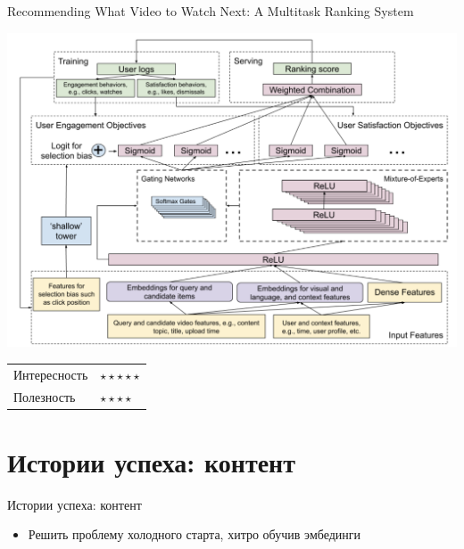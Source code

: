 \documentclass[11pt,aspectratio=169]{beamer}
\begin{document}
\begin{frame}{Recommending What Video to Watch Next: A Multitask Ranking System \cite{RANKING}}

\begin{center}
\includegraphics[scale=0.25]{images/multitask.png}
\end{center}

\begin{tabular}{l l}
Интересность & $\star\star\star\star\star$ \\
Полезность & $\star\star\star\star$
\end{tabular}

\end{frame}

\section{Истории успеха: контент}

\begin{frame}{Истории успеха: контент}

\begin{tcolorbox}[colback=info!5,colframe=info!80,title=Как оставить след в науке]
\begin{itemize}
\item Решить проблему холодного старта, хитро обучив эмбединги
\end{itemize}
\end{tcolorbox}

\end{frame}
\end{document}
